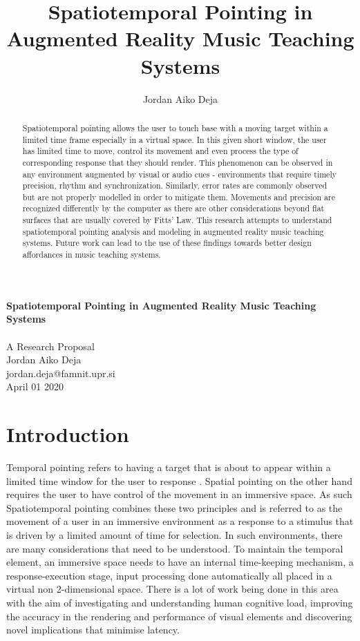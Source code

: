 \documentclass{article}
\title{Spatiotemporal Pointing in Augmented Reality Music Teaching Systems}
\author{Jordan Aiko Deja}
\begin{document}
\begin{center}
\large \textbf{Spatiotemporal Pointing in Augmented Reality Music Teaching Systems}
\\            
\vspace{0.5cm}\\
A Research Proposal\\
\vspace{0.5cm}
Jordan Aiko Deja\\
jordan.deja@famnit.upr.si\\
\vspace{0.5cm}
April 01 2020
\vspace{0.5cm}
\end{center}

\begin{abstract}
     Spatiotemporal pointing allows the user to touch base with a moving target within a limited time frame especially in a virtual space. In this given short window, the user has limited time to move, control its movement and even process the type of corresponding response that they should render. This phenomenon can be observed in any environment augmented by visual or audio cues - environments that require timely precision, rhythm and synchronization. Similarly, error rates are commonly observed but are not properly modelled in order to mitigate them. Movements and precision are recognized differently by the computer as there are other considerations beyond flat surfaces that are usually covered by Fitts' Law. This research attempts to understand spatiotemporal pointing analysis and modeling in augmented reality music teaching systems. Future work can lead to the use of these findings towards better design affordances in music teaching systems. 
\end{abstract}


\section{Introduction}
Temporal pointing refers to having a target that is about to appear within a limited time window for the user to response \cite{lee2016website}. Spatial pointing on the other hand requires the user to have control of the movement in an immersive space. As such Spatiotemporal pointing combines these two principles and is referred to as the movement of a user in an immersive environment as a response to a stimulus that is driven by a limited amount of time for selection. In such environments, there are many considerations that need to be understood. To maintain the temporal element, an immersive space needs to have an internal time-keeping mechanism, a response-execution stage, input processing done automatically all placed in a virtual non 2-dimensional space. There is a lot of work being done in this area with the aim of investigating and understanding human cognitive load, improving the accuracy in the rendering and performance of visual elements and discovering novel implications that minimise latency.\\
\end{document}
